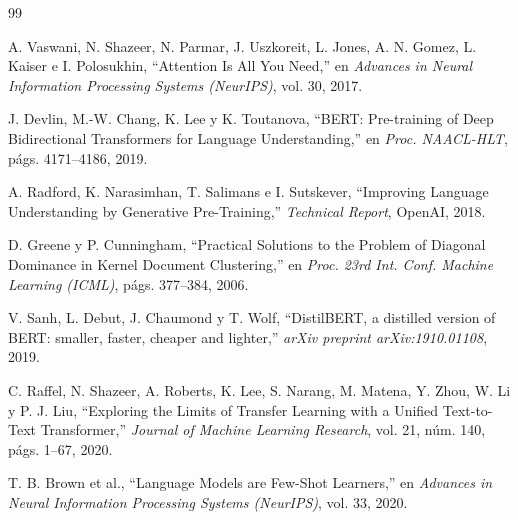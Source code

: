 \documentclass[letterpaper, 10 pt, conference]{latex_template/ieeeconf}
\begin{document}
\begin{thebibliography}{99}

 A. Vaswani, N. Shazeer, N. Parmar, J. Uszkoreit, L. Jones, A. N. Gomez, L. Kaiser e I. Polosukhin, ``Attention Is All You Need,'' en \textit{Advances in Neural Information Processing Systems (NeurIPS)}, vol. 30, 2017.

 J. Devlin, M.-W. Chang, K. Lee y K. Toutanova, ``BERT: Pre-training of Deep Bidirectional Transformers for Language Understanding,'' en \textit{Proc. NAACL-HLT}, págs. 4171--4186, 2019.

 A. Radford, K. Narasimhan, T. Salimans e I. Sutskever, ``Improving Language Understanding by Generative Pre-Training,'' \textit{Technical Report}, OpenAI, 2018.

 D. Greene y P. Cunningham, ``Practical Solutions to the Problem of Diagonal Dominance in Kernel Document Clustering,'' en \textit{Proc. 23rd Int. Conf. Machine Learning (ICML)}, págs. 377--384, 2006.

 V. Sanh, L. Debut, J. Chaumond y T. Wolf, ``DistilBERT, a distilled version of BERT: smaller, faster, cheaper and lighter,'' \textit{arXiv preprint arXiv:1910.01108}, 2019.

 C. Raffel, N. Shazeer, A. Roberts, K. Lee, S. Narang, M. Matena, Y. Zhou, W. Li y P. J. Liu, ``Exploring the Limits of Transfer Learning with a Unified Text-to-Text Transformer,'' \textit{Journal of Machine Learning Research}, vol. 21, núm. 140, págs. 1--67, 2020.

 T. B. Brown et al., ``Language Models are Few-Shot Learners,'' en \textit{Advances in Neural Information Processing Systems (NeurIPS)}, vol. 33, 2020.

\end{thebibliography}
\end{document}

